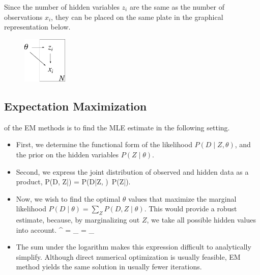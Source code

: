 Since the number of hidden variables $z_i$ are the same as the number of observations $x_i$, they can be placed on the same plate in the graphical representation below.
\begin{figure}[h]
\centering
	\includegraphics[height=22mm]{./figs/05-DZtheta.pdf}
\end{figure}

\subsection{Expectation Maximization}
 of the EM methods is to find the MLE estimate in the following setting.
\begin{itemize}
	\item First, we determine the functional form of the likelihood $P(D\;|\;Z, \theta)$, and the prior on the hidden variables $P(Z\;|\;\theta)$.
	\item Second, we express the joint distribution of observed and hidden data as a product, 
	\be
		P(D, Z\;|\;\theta) = P(D\;|\;Z, \theta)\, P(Z\;|\;\theta).
	\ee
	\item Now, we wish to find the optimal $\theta$ values that maximize the marginal likelihood $P(D\;|\;\theta) = \sum_Z P(D, Z\;|\;\theta)$. This would provide a robust estimate, because, by marginalizing out $Z$, we take all possible hidden values into account.
	\be
		\theta^ = \amax_{\theta}  = \amax_{\theta} 
	\ee
	\item The sum under the logarithm makes this expression difficult to analytically simplify. Although direct numerical optimization is usually feasible, EM method yields the same solution in usually fewer iterations.
\end{itemize}


